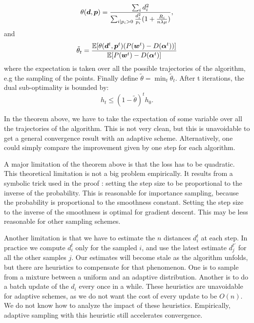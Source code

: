 \begin{subappendices}
\begin{theorem}
		\begin{equation}
			\theta(\bm d, \bm p) = \frac{\sum_i d_i^2}{\sum_{i | p_i >0} \frac{d_i^2}{p_i} (1+ \frac{R_i}{n \lambda \mu}) },
		\end{equation}
		and
		\begin{equation}
			\tilde \theta_t =  \frac{\operatorname{\mathbb{E}}[\theta(\bm d^t,\bm p^t) (P(\boldsymbol{w}^t) - D(\boldsymbol{\alpha}^t))] }{ \operatorname{\mathbb{E}}[P(\boldsymbol{w}^t) - D(\boldsymbol{\alpha}^t) ] }
		\end{equation}
		where the expectation is taken over all the possible trajectories of the algorithm, e.g the sampling of the points.
		Finally define $\tilde \theta = \min_t \tilde \theta_t$.
		After t iterations, the dual sub-optimality is bounded by:
		\begin{equation}
			h_t \leq (1- \tilde \theta )^t  h_0.
		\end{equation}
	\end{theorem}
	
	In the theorem above, we have to take the expectation of some variable over all the trajectories of the algorithm.
	This is not very clean, but this is unavoidable to get a general convergence result with an adaptive scheme.
	Alternatively, one could simply compare the improvement given by one step for each algorithm.
	
	A major limitation of the theorem above is that the loss has to be quadratic.
	This theoretical limitation is not a big problem empirically.
	It results from a symbolic trick used in the proof : setting the step size to be proportional to the inverse of the probability.
	This is reasonable for importance sampling, because the probability is proportional to the smoothness constant.
	Setting the step size to the inverse of the smoothness is optimal for gradient descent.
	This may be less reasonable for other sampling schemes.
	
	Another limitation is that we have to estimate the $n$ distances $d_i^t$ at each step.
	In practice we compute $d_i^t$ only for the sampled $i$, and use the latest estimate $d_j^{t'}$ for all the other samples $j$.
	Our estimates will become stale as the algorithm unfolds, but there are heuristics to compensate for that phenomenon.
	One is to sample from a mixture between a uniform and an adaptive distribution.
	Another is to do a batch update of the $d_i$ every once in a while.
	These heuristics are unavoidable for adaptive schemes, as we do not want the cost of every update to be $O(n)$.
	We do not know how  to analyze the impact of these heuristics.
	Empirically, adaptive sampling with this heuristic still accelerates convergence.
	

\end{subappendices}
